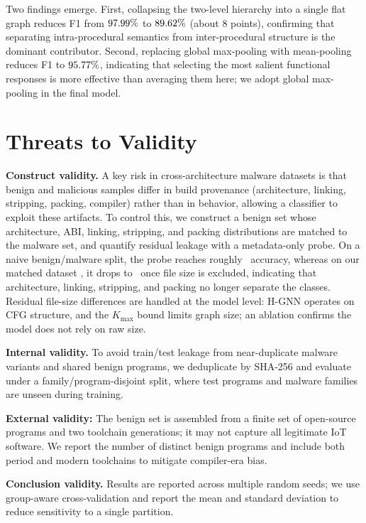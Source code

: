 \documentclass[conference]{IEEEtran}
\begin{document}
Two findings emerge. First, collapsing the two-level hierarchy into a
single flat graph reduces F1 from $97.99\%$ to $89.62\%$
(about $8$ points), confirming that separating intra-procedural semantics
from inter-procedural structure is the dominant contributor. Second,
replacing global max-pooling with mean-pooling reduces F1 to $95.77\%$,
indicating that selecting the most salient functional responses is more
effective than averaging them here; we adopt global max-pooling in the
final model.


\section{Threats to Validity}
\label{sec:threats}

\textbf{Construct validity.} A key risk in cross-architecture malware datasets is that benign and
malicious samples differ in build provenance (architecture, linking, stripping, packing, compiler)
rather than in behavior, allowing a classifier to exploit these artifacts. To control this, we
construct a benign set whose architecture, ABI, linking, stripping, and packing distributions are
matched to the malware set, and quantify residual leakage with a metadata-only probe. On a naive
benign/malware split, the probe reaches roughly \hgnnProbeOld\ accuracy, whereas on our matched dataset
, it drops to \hgnnProbeNoSize\ once file size is excluded, indicating that architecture, linking,
stripping, and packing no longer separate the classes. Residual file-size differences are handled at
the model level: H-GNN operates on CFG structure, and the $K_{\max}$ bound limits graph size; an
ablation confirms the model does not rely on raw size.

\textbf{Internal validity.} To avoid train/test leakage from near-duplicate malware variants and
shared benign programs, we deduplicate by SHA-256 and evaluate under a family/program-disjoint split,
where test programs and malware families are unseen during training.

\textbf{External validity:} The benign set is assembled from a finite set of open-source programs and
two toolchain generations; it may not capture all legitimate IoT software. We report the number of
distinct benign programs and include both period and modern toolchains to mitigate compiler-era bias.

\textbf{Conclusion validity.} Results are reported across multiple random seeds; we use group-aware
cross-validation and report the mean and standard deviation to reduce sensitivity to a single partition.
\end{document}
